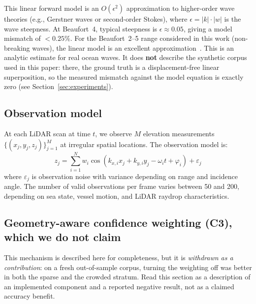\documentclass[review]{elsarticle}
\begin{document}
This linear forward model is an $O(\epsilon^2)$ approximation to
higher-order wave theories (e.g., Gerstner waves or second-order
Stokes), where $\epsilon = |k| \cdot |w|$ is the wave steepness.
At Beaufort~4, typical steepness is $\epsilon \approx 0.05$,
giving a model mismatch of $< 0.25\%$.
For the Beaufort~2--5 range considered in this work
(non-breaking waves), the linear model is an excellent
approximation~\citep{holthuijsen2007}.
This is an analytic estimate for real ocean waves.
It does \textbf{not} describe the synthetic corpus used in this paper: there,
the ground truth is a displacement-free linear superposition, so the measured
mismatch against the model equation is exactly zero (see
Section~\ref{sec:experiments}).

\subsection{Observation model}
\label{sec:obsmodel}

At each LiDAR scan at time $t$, we observe $M$ elevation measurements
$\{(x_j, y_j, z_j)\}_{j=1}^{M}$ at irregular spatial locations.
The observation model is:
\begin{equation}
  z_j = \sum_{i=1}^{N} w_i \cos(k_{x,i} x_j + k_{y,i} y_j - \omega_i t + \varphi_i) + \varepsilon_j
\end{equation}
where $\varepsilon_j$ is observation noise with variance depending on range
and incidence angle.  The number of valid observations per frame
varies between 50 and 200, depending on sea state, vessel motion,
and LiDAR raydrop characteristics.

\subsection{Geometry-aware confidence weighting (C3), which we do not claim}
\label{sec:c3}

This mechanism is described here for
completeness, but it is \emph{withdrawn as a contribution}: on a fresh
out-of-sample corpus, turning the weighting off was better in both the
sparse and the crowded stratum. Read this section as a description of an
implemented component and a reported negative result, not as a claimed
accuracy benefit.
\end{document}
